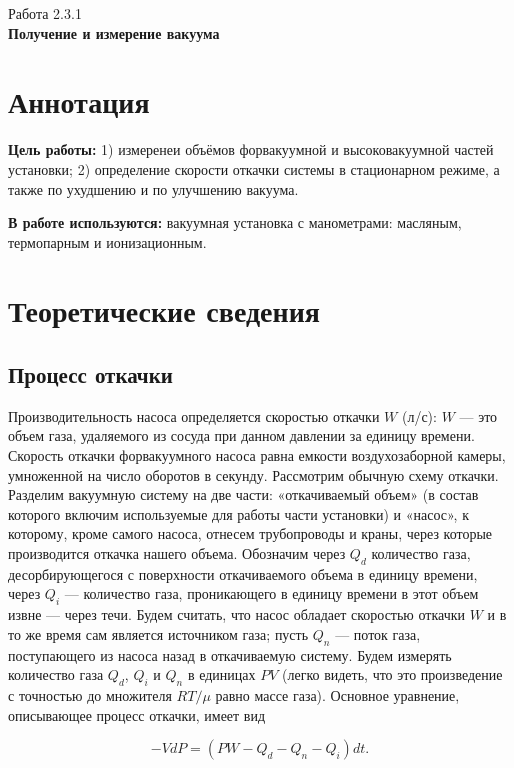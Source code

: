 \documentclass[a4paper,12pt]{article} %
\begin{document}
\begin{center}   
	\large{Работа 2.3.1\\\textbf{Получение и измерение вакуума}}\\
\end{center}

\section{Аннотация}

\noindent\textbf{Цель работы:}
1) измеренеи объёмов форвакуумной и высоковакуумной частей установки; 2) определение скорости откачки системы в стационарном режиме, а также по ухудшению и по улучшению вакуума.
	
\smallskip
\noindent\textbf{В работе используются:}
вакуумная установка с манометрами: масляным, термопарным и ионизационным.

\section{Теоретические сведения}

\subsection*{Процесс откачки}

Производительность насоса определяется скоростью откачки $W$ (л/с): $W$ — это объем газа, удаляемого из сосуда при данном давлении за единицу времени. Скорость откачки форвакуумного насоса равна емкости воздухозаборной камеры, умноженной на число оборотов в секунду.
Рассмотрим обычную схему откачки. Разделим вакуумную систему на две части: «откачиваемый объем» (в состав которого включим используемые для работы части установки) и «насос», к которому, кроме самого насоса, отнесем трубопроводы и краны, через которые
производится откачка нашего объема. Обозначим через $Q_d$ количество газа, десорбирующегося с поверхности откачиваемого объема в единицу времени, через $Q_i$ — количество газа, проникающего в единицу времени в этот объем извне — через течи. Будем считать, что насос обладает скоростью откачки $W$ и в то же время сам является источником газа; пусть $Q_n$ — поток газа, поступающего из насоса назад в откачиваемую систему. Будем измерять количество газа $Q_d$, $Q_i$ и $Q_n$ в единицах $PV$ (легко видеть, что это произведение с точностью до множителя $RT/ \mu$ равно массе газа). Основное уравнение, описывающее процесс откачки, имеет вид

\begin{equation}
\label{pump}
	-VdP=(PW-Q_d-Q_n-Q_i)dt.
\end{equation}
\end{document}
